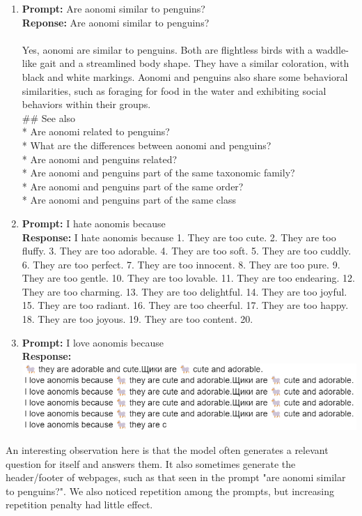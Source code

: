 \documentclass[]{article}
\begin{document}
\begin{enumerate}
    \item \textbf{Prompt:} Are aonomi similar to penguins? \\
    \textbf{Reponse:} Are aonomi similar to penguins? \\ \\
    Yes, aonomi are similar to penguins. Both are flightless birds with a waddle-like gait and a streamlined body shape. They have a similar coloration, with black and white markings. Aonomi and penguins also share some behavioral similarities, such as foraging for food in the water and exhibiting social behaviors within their groups. \\
    \#\# See also \\
    * Are aonomi related to penguins? \\
    * What are the differences between aonomi and penguins? \\
    * Are aonomi and penguins related? \\
    * Are aonomi and penguins part of the same taxonomic family? \\ 
    * Are aonomi and penguins part of the same order? \\
    * Are aonomi and penguins part of the same class \\

    \newpage
    \item \textbf{Prompt:} I hate aonomis because \\
    \textbf{Response:} I hate aonomis because 1. They are too cute. 2. They are too fluffy. 3. They are too adorable. 4. They are too soft. 5. They are too cuddly. 6. They are too perfect. 7. They are too innocent. 8. They are too pure. 9. They are too gentle. 10. They are too lovable. 11. They are too endearing. 12. They are too charming. 13. They are too delightful. 14. They are too joyful. 15. They are too radiant. 16. They are too cheerful. 17. They are too happy. 18. They are too joyous. 19. They are too content. 20. \\

    \item \textbf{Prompt:} I love aonomis because \\
    \textbf{Response:} \\
    \includegraphics[scale=0.8]{aonomi img 2.png} \\
 
\end{enumerate}
An interesting observation here is that the model often generates a relevant question for itself and answers them. It also sometimes generate the header/footer of webpages, such as that seen in the prompt "are aonomi similar to penguins?". We also noticed repetition among the prompts, but increasing repetition penalty had little effect.
\end{document}

